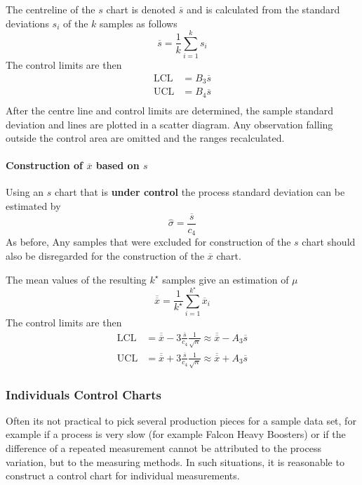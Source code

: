 \documentclass[11pt]{article}
\theoremstyle{definition}
\newcommand*\samplemean[1]{\overline{#1}}
\begin{document}
The centreline of the $s$ chart is denoted $\samplemean{s}$ and is calculated from the standard deviations $s_i$ of the $k$ samples as follows
\begin{equation*}
	\samplemean{s} = \frac{1}{k}\sum_{i=1}^{k} s_i
\end{equation*}
The control limits are then
\begin{align*}
	\text{LCL} &= B_3\samplemean{s}\\
	\text{UCL} &= B_4\samplemean{s}\\
\end{align*}
After the centre line and control limits are determined, the sample standard deviation and lines are plotted in a scatter diagram. Any observation falling outside the control area are omitted and the ranges recalculated.

\paragraph{Construction of $\samplemean{x}$ based on $s$} Using an $s$ chart that is \textbf{under control} the process standard deviation can be estimated by
\begin{equation*}
	\hat{\sigma} = \frac{\samplemean{s}}{c_4}
\end{equation*}
As before, Any samples that were excluded for construction of the $s$ chart should also be disregarded for the construction of the $\samplemean{x}$ chart.

The mean values of the resulting $k^\star$ samples give an estimation of $\mu$
\begin{equation*}
	\samplemean{\samplemean{x}} = \frac{1}{k^\star}\sum_{i=1}^{k^\star}\samplemean{x}_i
\end{equation*}
The control limits are then
\begin{align*}
	\text{LCL} &= \samplemean{\samplemean{x}} - 3 \frac{\samplemean{s}}{c_4}\frac{1}{\sqrt{n}} \approx \samplemean{\samplemean{x}} - A_3\samplemean{s}\\
	\text{UCL} &= \samplemean{\samplemean{x}} + 3 \frac{\samplemean{s}}{c_4}\frac{1}{\sqrt{n}} \approx \samplemean{\samplemean{x}} + A_3\samplemean{s}
\end{align*}

\subsubsection{Individuals Control Charts}
Often its not practical to pick several production pieces for a sample data set, for example if a process is very slow (for example Falcon Heavy Boosters) or if the difference of a repeated measurement cannot be attributed to the process variation, but to the measuring methods. In such situations, it is reasonable to construct a control chart for individual measurements.
\end{document}
